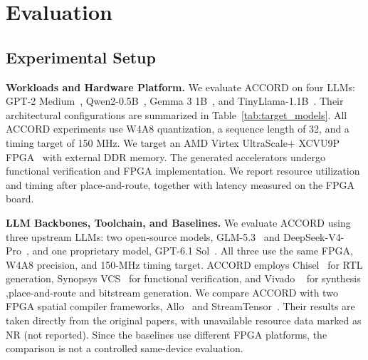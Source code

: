 \documentclass[9pt,conference]{IEEEtran}
\begin{document}
\section{Evaluation}
\subsection{Experimental Setup}
\textbf{Workloads and Hardware Platform.}
We evaluate ACCORD on four LLMs: GPT-2 Medium~\cite{gpt2},
Qwen2-0.5B~\cite{qwen2}, Gemma 3 1B~\cite{gemma3},
and TinyLlama-1.1B~\cite{tinyllama}. Their architectural
configurations are summarized in Table~\ref{tab:target_models}.
All ACCORD experiments use W4A8 quantization, a sequence
length of 32, and a timing target of 150 MHz. We target
an AMD Virtex UltraScale+ XCVU9P FPGA~\cite{amd_virtex}
with external DDR memory. The generated accelerators
undergo functional verification and FPGA implementation.
We report resource utilization and timing after place-and-route,
together with latency measured on the FPGA board.

\textbf{LLM Backbones, Toolchain, and Baselines.}
We evaluate ACCORD using three upstream LLMs: two
open-source models, GLM-5.3~\cite{glm5.3} and DeepSeek-V4-Pro~\cite{deepseekv4pro}, and
one proprietary model, GPT-6.1 Sol~\cite{gpt6.1sol}. All three use the
same FPGA, W4A8 precision, and 150-MHz timing target.
ACCORD employs Chisel~\cite{chisel} for RTL generation, Synopsys VCS~\cite{vcs}
for functional verification, and Vivado ~\cite{vivado} for synthesis
,place-and-route and bitstream generation. We compare ACCORD with two FPGA
spatial compiler frameworks, Allo~\cite{allo} and
StreamTensor~\cite{streamtensor}. Their results are taken
directly from the original papers, with unavailable
resource data marked as NR (not reported). Since the
baselines use different FPGA platforms, the comparison
is not a controlled same-device evaluation.
\end{document}
